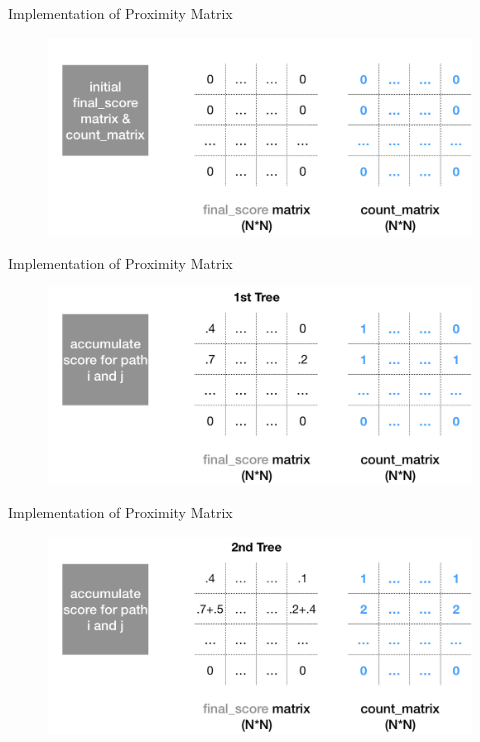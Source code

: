 \documentclass[shortpres]{beamer}
\begin{document}
    \begin{frame}{Implementation of Proximity Matrix}	
      \begin{figure}
        \includegraphics[height=0.6\textheight]{fig/proximity00.png}
      \end{figure}
    \end{frame}
    \begin{frame}{Implementation of Proximity Matrix}	
      \begin{figure}
        \includegraphics[height=0.6\textheight]{fig/proximity01.png}
      \end{figure}
    \end{frame}
    \begin{frame}{Implementation of Proximity Matrix}	
      \begin{figure}
        \includegraphics[height=0.6\textheight]{fig/proximity02.png}
      \end{figure}
    \end{frame}
\end{document}
